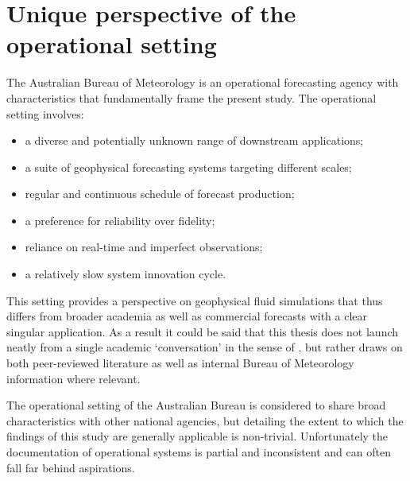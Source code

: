 \section{Unique perspective of the operational setting}
\label{S:operational_setting}

The Australian Bureau of Meteorology is an operational forecasting agency with characteristics that fundamentally frame the present study. The operational setting involves:
\begin{itemize}
    \item a diverse and potentially unknown range of downstream applications;
    \item a suite of geophysical forecasting systems targeting different scales;
    \item regular and continuous schedule of forecast production;
    \item a preference for reliability over fidelity;
    \item reliance on real-time and imperfect observations;
    \item a relatively slow system innovation cycle.
\end{itemize}
This setting provides a perspective on geophysical fluid simulations that thus differs from broader academia as well as commercial forecasts with a clear singular application.   As a result it could be said that this thesis does not launch neatly from a single academic `conversation' in the sense of \citeauthor{Booth:2009vy}, but rather draws on both peer-reviewed literature as well as internal Bureau of Meteorology information where relevant.

The operational setting of the Australian Bureau is considered to share broad characteristics with other national agencies, but detailing the extent to which the findings of this study are generally applicable is non-trivial.    
Unfortunately the documentation of operational systems is partial and inconsistent and can often fall far behind aspirations.  

